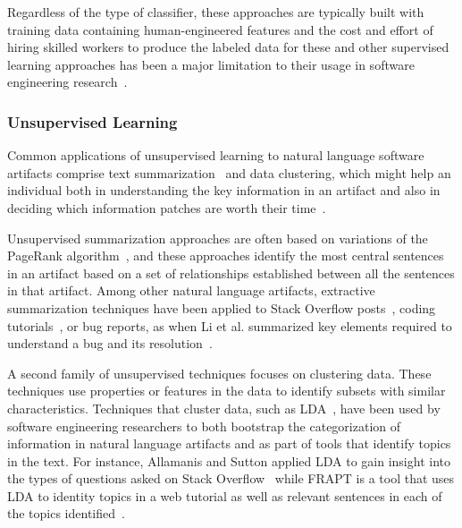 Regardless of the type of classifier, these approaches are typically built 
with training data containing human-engineered features and the cost and effort of hiring skilled workers to produce 
the labeled data for these and other supervised learning approaches
has been a major limitation to their usage in software engineering research~\cite{Arpteg2018, ferreira2021}.




\subsubsection{Unsupervised Learning}
\label{cp2:unsupervised}



Common applications of unsupervised learning 
to natural language software artifacts 
comprise text summarization~\cite{Goldsteinet1999} and data clustering, which might help an individual both in understanding the key information in an 
artifact and also in deciding which information patches are 
 worth their time~\cite{Lotufo2012}.


Unsupervised summarization approaches are often based on 
variations of the PageRank algorithm~\cite{Page1999}, and these approaches identify
the most central sentences in an artifact based on a set of relationships
established between all the sentences in that artifact.
Among other natural language artifacts,
extractive summarization techniques
have been applied to Stack Overflow posts~\cite{Ponzanelli2015},
coding tutorials~\cite{Li2018},
or bug reports, as
when Li et al. summarized 
key elements required to understand a bug and its resolution~\cite{li2018deep}.




A second family of unsupervised techniques focuses on clustering data.
These techniques use properties or features in the data to 
identify 
subsets with similar characteristics. 
Techniques that cluster data, such as \acf{LDA}~\cite{blei2003latent},
have been used by software engineering researchers to both 
bootstrap the categorization of information in 
natural language artifacts and as part of tools that identify topics in the text. 
For instance, Allamanis and Sutton
applied \acs{LDA}
to gain insight into the types of questions 
asked on Stack Overflow~\cite{Allamanis2013}
while FRAPT is a tool that 
uses \acs{LDA} to identity topics in a web tutorial
as well as relevant sentences in each of the topics identified~\cite{Jiang2017}.



